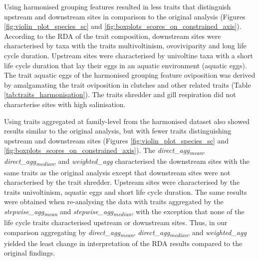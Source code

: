 \documentclass{article}
\begin{document}
Using harmonised grouping features resulted in less traits that distinguish upstream and downstream sites in comparison to the original analysis (Figures \ref{fig:violin_plot_species_sc} and \ref{fig:boxplots_scores_on_constrained_axis}). According to the RDA of the trait composition, downstream sites were characterised by taxa with the traits multivoltinism, ovoviviparity and long life cycle duration. Upstream sites were characterised by univoltine taxa with a short life cycle duration that lay their eggs in an aquatic environment (aquatic eggs). The trait aquatic eggs of the harmonised grouping feature oviposition was derived by amalgamating the trait oviposition in clutches and other related traits (Table \ref{tab:traits_harmonisation}). The traits shredder and gill respiration did not characterise sites with high salinisation.

Using traits aggregated at family-level from the harmonised dataset also showed results similar to the original analysis, but with fewer traits distinguishing upstream and downstream sites (Figures \ref{fig:violin_plot_species_sc} and \ref{fig:boxplots_scores_on_constrained_axis}). The \textit{direct\_agg\textsubscript{mean}}, \textit{direct\_agg\textsubscript{median}}, and \textit{weighted\_agg} 
characterised the downstream sites with the same traits as the original analysis except that downstream sites were not characterised by the trait shredder. Upstream sites were characterised by the traits univoltinism, aquatic eggs and short life cycle duration. The same results were obtained when re-analysing the data with traits aggregated by the \textit{stepwise\_agg\textsubscript{mean}} and \textit{stepwise\_agg\textsubscript{median}}, with the exception that none of the life cycle traits characterised upstream or downstream sites. Thus, in our comparison aggregating by \textit{direct\_agg\textsubscript{mean}}, \textit{direct\_agg\textsubscript{median}}, and \textit{weighted\_agg} yielded the least change in interpretation of the RDA results compared to the original findings.
\end{document}
